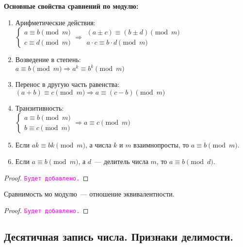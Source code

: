 \documentclass[11pt]{article}
\begin{document}
\textbf{Основные свойства сравнений по модулю:}
\begin{enumerate}
	\item Арифметические действия:\\
	$\begin{cases}
	a \equiv b \pmod m \\
	c \equiv d \pmod m
	\end{cases} \Longrightarrow \left . \begin{array}{l}(a \pm c) \equiv (b \pm d) \pmod m \\ a \cdot c \equiv b \cdot d \pmod m \end{array} \right .$
	\item Возведение в степень:\\
	$a \equiv b \pmod m \Longrightarrow a^k \equiv b^k \pmod m$
	\item
	Перенос в другую часть равенства:\\
	$(a + b) \equiv c \pmod m \Longrightarrow a \equiv (c - b) \pmod m$
	\item Транзитивность:\\
	$\begin{cases} a \equiv b \pmod m \\ b \equiv c \pmod m\end{cases} \Longrightarrow a \equiv c \pmod m$
	\item Если $ak \equiv bk\pmod{m}$, а числа $k$ и $m$ взаимнопросты, то $a \equiv b \pmod{m}$.
	\item Если $a \equiv b \pmod{m}$, а $d$~--- делитель числа $m$, то $a \equiv b \pmod{d}$.
\end{enumerate}
\begin{proof}

	\textcolor{magenta}{\texttt{Будет добавлено.}}

\end{proof}

\begin{statement}

    Сравнимость мо модулю~--- отношение эквивалентности.

\end{statement}
\begin{proof}

    \textcolor{magenta}{\texttt{Будет добавлено.}}

\end{proof}

\subsection{Десятичная запись числа. Признаки делимости.}
\end{document}
